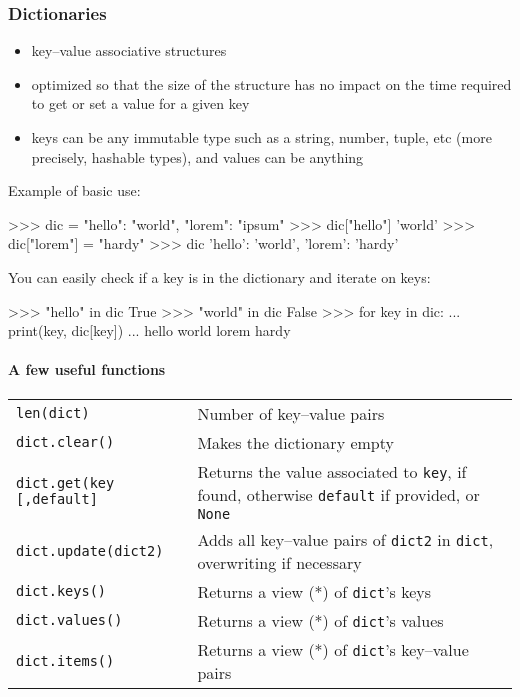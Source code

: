 \documentclass[twocolumn]{article}
\let\oldparagraph\paragraph
\renewcommand{\paragraph}[1]{\oldparagraph{#1}\mbox{}}
\begin{document}
\subsubsection{Dictionaries}\label{dictionaries}

\begin{itemize}
\item key--value associative structures
\item optimized so that the size of the structure has no impact on the time required to get or set a value for a given key
\item keys can be any immutable type such as a string, number, tuple, etc (more precisely, hashable types), and values can be anything
\end{itemize}

Example of basic use:
\begin{python}
>>> dic = {"hello": "world", "lorem": "ipsum"}
>>> dic["hello"]
'world'
>>> dic["lorem"] = "hardy"
>>> dic
{'hello': 'world', 'lorem': 'hardy'}
\end{python}

You can easily check if a key is in the dictionary and iterate on keys:
\begin{python}
>>> "hello" in dic
True
>>> "world" in dic
False
>>> for key in dic:
...     print(key, dic[key])
... 
hello world
lorem hardy
\end{python}

\paragraph{A few useful functions}\label{dictusefulfunc}

\begin{tabular}{|p{3.25cm}|p{5cm}|}
\hline
\texttt{len(dict)} & Number of key--value pairs \\
\texttt{dict.clear()} & Makes the dictionary empty \\
\texttt{dict.get(key [,default]} & Returns the value associated to \texttt{key}, if found, otherwise \texttt{default} if provided, or \texttt{None} \\
\texttt{dict.update(dict2)} & Adds all key--value pairs of \texttt{dict2} in \texttt{dict}, overwriting if necessary \\ 
\texttt{dict.keys()} & Returns a view (*) of \texttt{dict}'s keys \\
\texttt{dict.values()} & Returns a view (*) of \texttt{dict}'s values \\ 
\texttt{dict.items()} & Returns a view (*) of \texttt{dict}'s key--value pairs
\\ \hline
\end{tabular}
\end{document}
